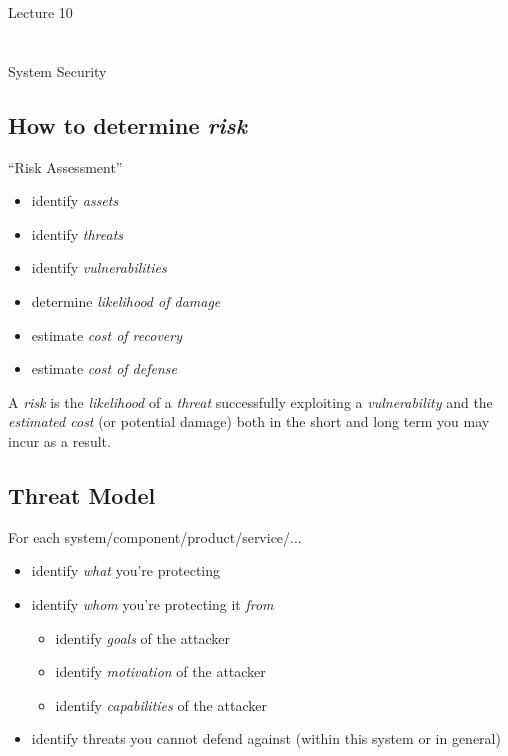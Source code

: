 \documentclass[xga]{xdvislides}
\begin{document}
\newpage
\vspace*{\fill}
\begin{center}
    \Hugesize
        Lecture 10 \\ [1em]
    \hspace*{5mm}
    \blueline\\
    \hspace*{5mm}\\
	System Security
\end{center}
\vspace*{\fill}

\subsection{How to determine {\em risk}}
``Risk Assessment''
\begin{itemize}
	\item identify {\em assets}
	\item identify {\em threats}
	\item identify {\em vulnerabilities}
	\item determine {\em likelihood of damage}
	\item estimate {\em cost of recovery}
	\item estimate {\em cost of defense}
\end{itemize}
\vspace{.5in}

A {\em risk} is the {\em likelihood} of a {\em threat} successfully exploiting
a {\em vulnerability} and the {\em estimated cost} (or potential damage) both
in the short and long term you may incur as a result.

\subsection{Threat Model}
For each system/component/product/service/...

\begin{itemize}
	\item identify {\em what} you're protecting
	\item identify {\em whom} you're protecting it {\em from}
		\begin{itemize}
			\item identify {\em goals} of the attacker
			\item identify {\em motivation} of the attacker
			\item identify {\em capabilities} of the attacker
		\end{itemize}
	\item identify threats you cannot defend against (within this
		system or in general)
\end{itemize}
\end{document}
